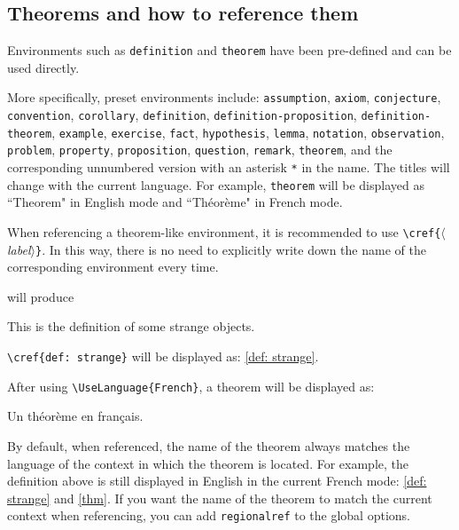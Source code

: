 \documentclass[allowbf,puretext]{colorart}
\theoremstyle{basic}
\theoremstyle{emphasis}
\theoremstyle{simple}
\providecommand{\meta}[1]{$\langle${\normalfont\itshape#1}$\rangle$}
\newenvironment{tip}[1][Tip]{%
    \begin{tcolorbox}[breakable,
        enhanced,
        width = \textwidth,
        colback = paper, colbacktitle = paper,
        colframe = gray!50, boxrule=0.2mm,
        coltitle = black,
        fonttitle = \sffamily,
        attach boxed title to top left = {yshift=-\tcboxedtitleheight/2, xshift=.5cm},
        boxed title style = {boxrule=0pt, colframe=paper},
        before skip = 0.3cm,
        after skip = 0.3cm,
        top = 3mm,
        bottom = 3mm,
        title={\scshape\sffamily #1}]%
}{\end{tcolorbox}}
\begin{document}
\subsection{Theorems and how to reference them}

Environments such as \texttt{definition} and \texttt{theorem} have been pre-defined and can be used directly. 

More specifically, preset environments include: 
\texttt{assumption}, \texttt{axiom}, \texttt{conjecture}, \texttt{convention}, \texttt{corollary}, \texttt{definition}, \texttt{definition-proposition}, \texttt{definition-theorem}, \texttt{example}, \texttt{exercise}, \texttt{fact}, \texttt{hypothesis}, \texttt{lemma}, \texttt{notation}, \texttt{observation}, \texttt{problem}, \texttt{property}, \texttt{proposition}, \texttt{question}, \texttt{remark}, \texttt{theorem}, and the corresponding unnumbered version with an asterisk \lstinline|*| in the name. The titles will change with the current language. For example, \texttt{theorem} will be displayed as ``Theorem" in English mode and ``Théorème" in French mode.

\medskip
When referencing a theorem-like environment, it is recommended to use \lstinline|\cref{|\meta{label}\texttt{\}}. In this way, there is no need to explicitly write down the name of the corresponding environment every time.

\begin{tip}[Example]

\lstinline|\cref{def: strange}| will be displayed as: \cref{def: strange}.

\medskip
After using \lstinline|\UseLanguage{French}|, a theorem will be displayed as:

\begin{theorem}[Inutile]\label{thm}
    Un théorème en français.
\end{theorem}

By default, when referenced, the name of the theorem always matches the language of the context in which the theorem is located. For example, the definition above is still displayed in English in the current French mode: \cref{def: strange} and \cref{thm}. If you want the name of the theorem to match the current context when referencing, you can add \texttt{regionalref} to the global options.
\end{tip}
\end{document}
